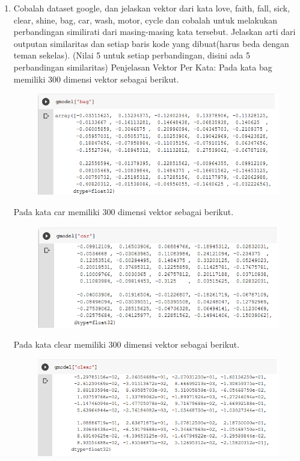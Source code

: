 \begin{enumerate}
	\item Cobalah dataset google, dan jelaskan vektor dari kata love, faith, fall, sick, clear, shine, bag, car, wash, motor, cycle dan cobalah untuk melakukan perbandingan similirati dari masing-masing kata tersebut. Jelaskan arti dari outputan similaritas dan setiap baris kode yang dibuat(harus beda dengan teman sekelas). (Nilai 5 untuk setiap perbandingan, disini ada 5 perbandingan similaritas)
	\hfill\break
	Penjelasan Vektor Per Kata:
	\hfill\break
	Pada kata bag memiliki 300 dimensi vektor sebagai berikut.
	\hfill\break
	\begin{figure}[H]
	\centering
		\includegraphics[width=8 cm]{figures/1174006/chapter5/soalpraktek/bag.PNG}
	\end{figure}

	\hfill\break
	Pada kata car memiliki 300 dimensi vektor sebagai berikut.
	\hfill\break
	\begin{figure}[H]
	\centering
		\includegraphics[width=8 cm]{figures/1174006/chapter5/soalpraktek/car.PNG}
	\end{figure}

	\hfill\break
	Pada kata clear memiliki 300 dimensi vektor sebagai berikut.
	\hfill\break
	\begin{figure}[H]
	\centering
		\includegraphics[width=8 cm]{figures/1174006/chapter5/soalpraktek/clear.PNG}
	\end{figure}


\end{enumerate}
